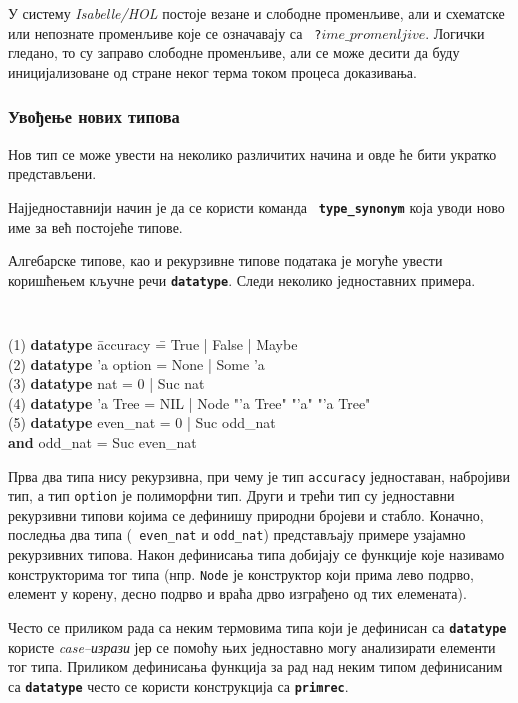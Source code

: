 У систему \emph{Isabelle/HOL} постоје везане и слободне променљиве,
али и схематске или непознате променљиве које се означавају са {\tt
  ?$ime\_promenljive$}. Логички гледано, то су заправо слободне
променљиве, али се може десити да буду иницијализоване од стране неког
терма током процеса доказивања. 

\subsubsection{Увођење нових типова}

Нов тип се може увести на неколико различитих начина и овде ће бити
укратко представљени. 

Најједноставнији начин је да се користи команда {\tt
  \textbf{type\_synonym}} која уводи ново име за већ постојеће типове.

Алгебарске типове, као и рекурзивне типове података је могуће увести
коришћењем кључне речи {\tt \textbf{datatype}}. Следи неколико
једноставних примера.

\begin{small}
{\tt
  \begin{tabbing}
  (1) \= \textbf{datatype} \= accuracy \= =  True | False | Maybe \\
  (2) \> \textbf{datatype} \> 'a option \> = None | Some 'a \\
  (3) \> \textbf{datatype} \> nat \> = 0 | Suc nat \\
  (4) \> \textbf{datatype} \> 'a Tree \> = NIL | Node "'a Tree" "'a" "'a Tree" \\
  (5) \> \textbf{datatype} \> even\_nat \> = 0 | Suc odd\_nat \\
      \> \textbf{and}      \> odd\_nat \> = Suc even\_nat 
  \end{tabbing}
}
\end{small}

 Прва два типа нису рекурзивна, при чему је тип {\tt accuracy}
 једноставан, набројиви тип, а тип {\tt option} је полиморфни
 тип. Други и трећи тип су једноставни рекурзивни типови којима се
 дефинишу природни бројеви и стабло. Коначно, последња два типа ({\tt
   even\_nat} и {\tt odd\_nat}) представљају примере узајамно
 рекурзивних типова.  Након дефинисања типа добијају се функције које
 називамо конструкторима тог типа (нпр. {\tt Node} је конструктор који
 прима лево подрво, елемент у корену, десно подрво и враћа дрво
 изграђено од тих елемената).

Често се приликом рада са неким термовима типа који је дефинисан са
{\tt \textbf{datatype}} користе \emph{case--изрази} јер се помоћу њих
једноставно могу анализирати елементи тог типа. Приликом дефинисања
функција за рад над неким типом дефинисаним са {\tt \textbf{datatype}}
често се користи конструкција са {\tt \textbf{primrec}}.

